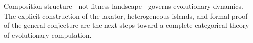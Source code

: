 \documentclass[submission,copyright,creativecommons]{eptcs}
\begin{document}
Composition structure---not fitness landscape---governs evolutionary
dynamics. The explicit construction of the laxator, heterogeneous
islands, and formal proof of the general conjecture are the next
steps toward a complete categorical theory of evolutionary
computation.

{\small


}
\end{document}
